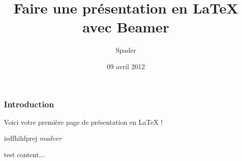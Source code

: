\documentclass{beamer}
\begin{document}
\title{Faire une présentation en LaTeX avec Beamer}
\author{Spader}
\date{09 avril 2012}

	\begin{frame}
		\titlepage
	\end{frame}

	\begin{frame}
	\frametitle{Introduction}
	Voici votre premi\`{e}re page de pr\'{e}sentation en LaTeX !
	
	\begin{semiverbatim}
		isdfhihfprej $ma dver$
	\end{semiverbatim}
	\end{frame}

	\begin{frame}
		\begin{exampleblock}{test}
			content...
		\end{exampleblock}
	\end{frame}
\end{document}
